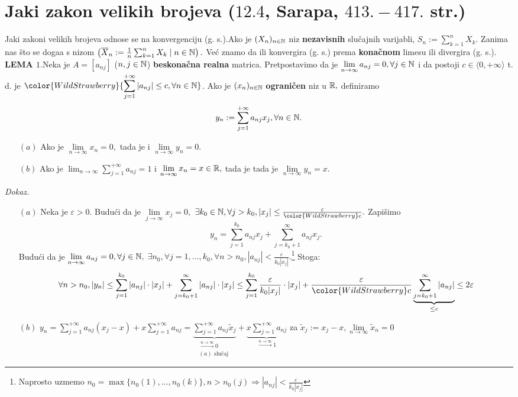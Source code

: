 \documentclass{article}
\begin{document}
 \section{Jaki zakon velikih brojeva (\textsection \(12.4\), Sarapa, \(413.-417.\) str.)}
 Jaki zakoni velikih brojeva odnose se na konvergenciju (g. s.).\newline Ako je \((X_n)_{n\in\Bbb N}\) niz \textbf{nezavisnih} slučajnih varijabli, \(S_n:=\sum_{k=1}^nX_k.\) Zanima nas što se doga\dj{}a s nizom \(\left(\overline X_n:=\frac1n\sum_{k=1}^nX_k\mid n\in\Bbb N\right).\) Već znamo da ili konvergira (g. s.) prema \textbf{konačnom} limesu ili divergira (g. s.).\newline\newline
 \textbf{LEMA \(1.\)}\newline Neka je \(A=[a_{nj}]\) (\(n,j\in\Bbb N\)) \textbf{beskonačna realna} matrica. Pretpostavimo da je \(\lim\limits_{n\to\infty}a_{nj}=0,\forall j\in\Bbb N\) i da postoji  \(c\in\langle0,+\infty\rangle\) t. d. je \(\color{WildStrawberry}{\displaystyle\sum_{j=1}^{+\infty}|a_{nj}|\le c,\forall n\in\Bbb N}\). Ako je \((x_n)_{n\in\Bbb N}\) \textbf{ograničen} niz u \(\Bbb R,\) definiramo \[y_n:=\sum_{j=1}^{+\infty}a_{nj}x_j,\forall n\in\Bbb N.\] 
 \begin{enumerate}
     \item[\((a)\)] Ako je \(\lim\limits_{n\to\infty}x_n=0,\) tada je i \(\lim\limits_{n\to\infty}y_n=0.\)
     \item[\((b)\)] Ako je \(\displaystyle\lim_{n\to\infty}\sum_{j=1}^{+\infty}a_{nj}=1\) i \(\lim\limits_{n\to\infty}x_n=x\in\Bbb R,\) tada je tada je \(\lim\limits_{n\to\infty}y_n=x.\)
\end{enumerate}
\textit{Dokaz.}
\begin{enumerate}
    \item[\((a)\)] Neka je \(\varepsilon>0.\) Budući da je \(\lim\limits_{j\to\infty}x_j=0,\) \(\exists k_0\in\Bbb N,\forall j> k_0,|x_j|\le\frac\varepsilon{\color{WildStrawberry}c}.\) Zapišimo \[y_n=\sum_{j=1}^{k_0}a_{nj}x_j+\sum_{j={k_0}+1}^\infty a_{nj}x_j.\] Budući da je \(\lim\limits_{n\to\infty}a_{nj}=0,\forall j\in\Bbb N,\) \(\exists n_0,\forall j=1,\ldots,k_0,\forall n>n_0, |a_{nj}|<\frac\varepsilon{k_0|x_j|}.\)\footnote[19]{Naprosto uzmemo \(n_0=\max\{n_0(1),\ldots, n_0(k)\},n>n_0(j)\Rightarrow|a_{nj}|<\frac\varepsilon{k_0|x_j|}\)} Stoga: \[\forall n>n_0,|y_n|\le\sum_{j=1}^{k_0}|a_{nj}|\cdot|x_j|+\sum_{j=k_0+1}^\infty|a_{nj}|\cdot|x_j|\le\sum_{j=1}^{k_0}\frac\varepsilon{k_0|x_j|}\cdot|x_j|+\frac\varepsilon{\color{WildStrawberry}c}\underbrace{\sum_{j=k_0+1}^\infty|a_{nj}|}_{\le c}\le 2\varepsilon\]
    \item[\((b)\)] \(\displaystyle y_n=\sum_{j=1}^{+\infty}a_{nj}(x_j-x)+x\sum_{j=1}^{+\infty}a_{nj}=\underbrace{\sum_{j=1}^{+\infty}a_{nj}\tilde x_j}_{\substack{\overset{n\to\infty}{\longrightarrow}0\\(a)\text{ slučaj }}}+\underbrace{x\sum_{j=1}^{+\infty}a_{nj}}_{\overset{n\to\infty}{\longrightarrow}1}\) za \(\tilde x_j:=x_j-x,\lim\limits_{n\to\infty}\tilde x_n=0\) 
\end{enumerate}
\end{document}
